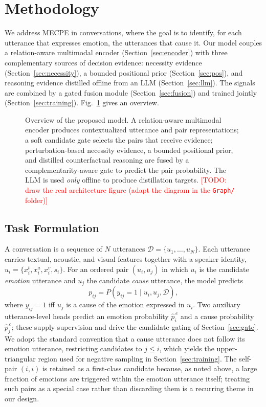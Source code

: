 \documentclass[journal]{IEEEtran}
\newcommand{\todo}[1]{\textcolor{red}{[TODO: #1]}}
\newcommand{\phbox}[2]{%
  \fbox{\parbox[c][#1][c]{\dimexpr#2-2\fboxsep-2\fboxrule\relax}{%
  \centering\itshape\small Placeholder figure --- replace with the real graphic.}}}
\begin{document}
\section{Methodology}
\label{sec:method}
We address MECPE in conversations, where the goal is to identify, for each utterance
that expresses emotion, the utterances that cause it. Our model couples a relation-aware
multimodal encoder (Section~\ref{sec:encoder}) with three complementary sources of
decision evidence: necessity evidence (Section~\ref{sec:necessity}), a bounded positional
prior (Section~\ref{sec:pos}), and reasoning evidence distilled offline from an LLM
(Section~\ref{sec:llm}). The signals are combined by a gated fusion module
(Section~\ref{sec:fusion}) and trained jointly (Section~\ref{sec:training}).
Fig.~\ref{fig:overview} gives an overview.

\begin{figure}[t]
  \centering
  \phbox{6.0cm}{\textwidth}
  \caption{Overview of the proposed model. A relation-aware multimodal encoder produces
  contextualized utterance and pair representations; a soft candidate gate selects the
  pairs that receive evidence; perturbation-based necessity evidence, a bounded positional
  prior, and distilled counterfactual reasoning are fused by a complementarity-aware gate
  to predict the pair probability. The LLM is used \emph{only} offline to produce
  distillation targets. \todo{draw the real architecture figure (adapt the diagram in the \texttt{Graph/} folder)}}
  \label{fig:overview}
\end{figure}

\subsection{Task Formulation}
\label{sec:task}
A conversation is a sequence of $N$ utterances $\mathcal{D}=\{u_1,\ldots,u_N\}$. Each
utterance carries textual, acoustic, and visual features together with a speaker
identity, $u_i=\{x_i^{t},x_i^{a},x_i^{v},s_i\}$. For an ordered pair $(u_i,u_j)$ in which
$u_i$ is the candidate \emph{emotion} utterance and $u_j$ the candidate \emph{cause}
utterance, the model predicts
\begin{equation}
p_{ij}=P\!\left(y_{ij}=1 \mid u_i,u_j,\mathcal{D}\right),
\end{equation}
where $y_{ij}=1$ iff $u_j$ is a cause of the emotion expressed in $u_i$. Two auxiliary
utterance-level heads predict an emotion probability $\hat p^{\,e}_i$ and a cause
probability $\hat p^{\,c}_j$; these supply supervision and drive the candidate gating of
Section~\ref{sec:gate}. We adopt the standard convention that a cause utterance does not
follow its emotion utterance, restricting candidates to $j\le i$, which yields the
upper-triangular region used for negative sampling in Section~\ref{sec:training}. The
self-pair $(i,i)$ is retained as a first-class candidate because, as noted above, a large
fraction of emotions are triggered within the emotion utterance itself; treating such pairs
as a special case rather than discarding them is a recurring theme in our design.
\end{document}
